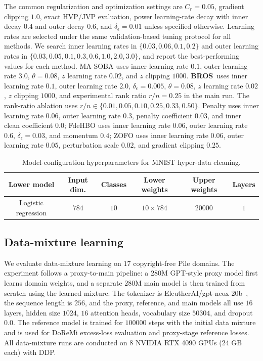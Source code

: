 \documentclass{pkumelon}
\theoremstyle{plain}
\newcommand{\oursname}{\textnormal{\textbf{BROS}}}
\newcommand{\ours}{\oursname\ }
\begin{document}
The common regularization and optimization settings are $C_r=0.05$, gradient clipping $1.0$, exact HVP/JVP evaluation, power learning-rate decay with inner decay $0.4$ and outer decay $0.6$, and $\delta_{\epsilon}=0.01$ unless specified otherwise. Learning rates are selected under the same validation-based tuning protocol for all methods. We search inner learning rates in $\{0.03,0.06,0.1,0.2\}$ and outer learning rates in $\{0.03,0.05,0.1,0.3,0.6,1.0,2.0,3.0\}$, and report the best-performing values for each method. MA-SOBA uses inner learning rate $0.1$, outer learning rate $3.0$, $\theta=0.08$, $z$ learning rate $0.02$, and $z$ clipping $1000$. \ours uses inner learning rate $0.1$, outer learning rate $2.0$, $\delta_{\epsilon}=0.005$, $\theta=0.08$, $z$ learning rate $0.02$, $z$ clipping $1000$, and experimental rank ratio $r/n=0.25$ in the main run. The rank-ratio ablation uses $r/n\in\{0.01,0.05,0.10,0.25,0.33,0.50\}$. Penalty uses inner learning rate $0.06$, outer learning rate $0.3$, penalty coefficient $0.03$, and inner clean coefficient $0.0$; FdeHBO uses inner learning rate $0.06$, outer learning rate $0.6$, $\delta_{\epsilon}=0.03$, and momentum $0.4$; ZOFO uses inner learning rate $0.06$, outer learning rate $0.05$, perturbation scale $0.02$, and gradient clipping $0.25$.

\begin{table}[t!]
\centering
\caption{Model-configuration hyperparameters for MNIST hyper-data cleaning.}
\label{tab:mnist_hyperparams}
\small
\setlength{\tabcolsep}{4pt}
\renewcommand{\arraystretch}{1.12}
\begin{threeparttable}
\begin{tabular}{cccccc}
\toprule
Lower model & Input dim. & Classes & Lower weights & Upper weights & Layers \\
\midrule
Logistic regression & $784$ & $10$ & $10\times 784$ & $20000$ & $1$ \\
\bottomrule
\end{tabular}
\end{threeparttable}
\end{table}

\subsection{Data-mixture learning}
We evaluate data-mixture learning on $17$ copyright-free Pile domains. The experiment follows a proxy-to-main pipeline: a $280$M GPT-style proxy model first learns domain weights, and a separate $280$M main model is then trained from scratch using the learned mixture. The tokenizer is EleutherAI/gpt-neox-20b~\cite{black2022gpt}, the sequence length is $256$, and the proxy, reference, and main models all use $16$ layers, hidden size $1024$, $16$ attention heads, vocabulary size $50304$, and dropout $0.0$. The reference model is trained for $100000$ steps with the initial data mixture and is used for DoReMi excess-loss evaluation and proxy-stage reference losses.
All data-mixture runs are conducted on $8$ NVIDIA RTX 4090 GPUs ($24$ GB each) with DDP.
\end{document}
